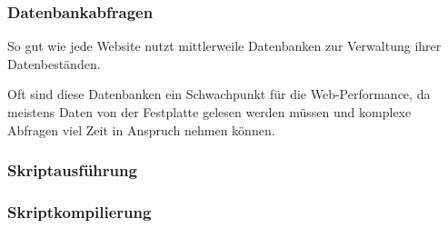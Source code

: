 \subsubsection{Datenbankabfragen}
So gut wie jede Website nutzt mittlerweile Datenbanken zur Verwaltung ihrer Datenbeständen.

Oft sind diese Datenbanken ein Schwachpunkt für die Web-Performance, da meistens Daten von der Festplatte gelesen werden müssen und komplexe Abfragen viel Zeit in Anspruch nehmen können.

\subsubsection{Skriptausführung}
\subsubsection{Skriptkompilierung}

